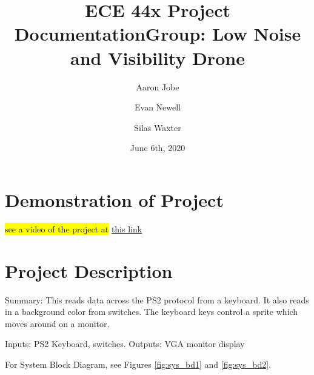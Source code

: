 \documentclass[a4paper]{article}
\title{ECE 44x Project Documentation\newline Group: Low Noise and Visibility Drone}
\author{ Aaron Jobe \and Evan Newell \and Silas Waxter}
\date{June 6th, 2020}
\begin{document}

\maketitle
\newpage
\tableofcontents
\newpage

\section{Demonstration of Project}
\hl{see a video of the project at }\href{https://vimeo.com/717762161}{this link}

\section{Project Description}
Summary: This reads data across the PS2 protocol from a keyboard.  It also reads in a background color from switches.  The keyboard keys control a sprite which moves around on a monitor.

Inputs:     PS2 Keyboard, switches.
Outputs:    VGA monitor display

For System Block Diagram, see Figures \ref{fig:sys_bd1} and \ref{fig:sys_bd2}. 
\end{document}
